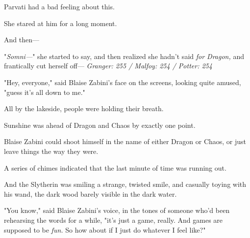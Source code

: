Parvati had a bad feeling about this.

She stared at him for a long moment.

And then---

"\emph{Somni---}" she started to say, and then realized she hadn't said \emph{for
Dragon,} and frantically cut herself off---
\later
\emph{Granger: 255 / Malfoy: 254 / Potter: 254}

"Hey, everyone," said Blaise Zabini's face on the screens, looking quite
amused, "guess it's all down to me."

All by the lakeside, people were holding their breath.

Sunshine was ahead of Dragon and Chaos by exactly one point.

Blaise Zabini could shoot himself in the name of either Dragon or Chaos, or
just leave things the way they were.

A series of chimes indicated that the last minute of time was running out.

And the Slytherin was smiling a strange, twisted smile, and casually toying
with his wand, the dark wood barely visible in the dark water.

"You know," said Blaise Zabini's voice, in the tones of someone who'd been
rehearsing the words for a while, "it's just a game, really. And games are
supposed to be \emph{fun.} So how about if I just do whatever I feel like?"
